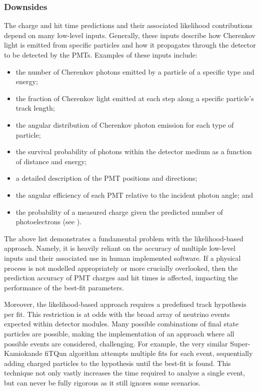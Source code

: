 \subsubsection*{Downsides} %

The charge and hit time predictions and their associated likelihood contributions depend on many
low-level inputs. Generally, these inputs describe how Cherenkov light is emitted from specific
particles and how it propagates through the detector to be detected by the PMTs. Examples of these
inputs include:
\begin{itemize}
    \item the number of Cherenkov photons emitted by a particle of a specific type and energy;
    \item the fraction of Cherenkov light emitted at each step along a specific particle's track
          length;
    \item the angular distribution of Cherenkov photon emission for each type of particle;
    \item the survival probability of photons within the detector medium as a function of distance
          and energy;
    \item a detailed description of the PMT positions and directions;
    \item the angular efficiency of each PMT relative to the incident photon angle; and
    \item the probability of a measured charge given the predicted number of photoelectrons (see
          ).
\end{itemize}

The above list demonstrates a fundamental problem with the likelihood-based approach. Namely, it
is heavily reliant on the accuracy of multiple low-level inputs and their associated use in human
implemented software. If a physical process is not modelled appropriately or more crucially
overlooked, then the prediction accuracy of PMT charges and hit times is affected, impacting the
performance of the best-fit parameters.

Moreover, the likelihood-based approach requires a predefined track hypothesis per fit. This
restriction is at odds with the broad array of neutrino events expected within \chips detector
modules. Many possible combinations of final state particles are possible, making the
implementation of an approach where all possible events are considered, challenging. For example,
the very similar Super-Kamiokande fiTQun algorithm attempts multiple fits for each event,
sequentially adding charged particles to the hypothesis until the best-fit is found. This
technique not only vastly increases the time required to analyse a single event, but can never be
fully rigorous as it still ignores some scenarios.

